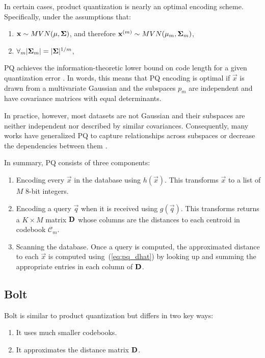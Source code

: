 In certain cases, product quantization is nearly an optimal encoding scheme. Specifically, under the assumptions that:
\begin{enumerate}[leftmargin=7mm]
\item $\mathbf{x} \sim MVN(\mathbf{\mu}, \mathbf{\Sigma})$, and therefore $\mathbf{x}^{(m)} \sim MVN(\mathbf{\mu}_m, \mathbf{\Sigma}_m)$,
\item $\forall_m |\mathbf{\Sigma}_m| = |\mathbf{\Sigma}|^{1/m}$,
\end{enumerate}
PQ achieves the information-theoretic lower bound on code length for a given quantization error \cite{opq}. In words, this means that PQ encoding is optimal if $\vec{x}$ is drawn from a multivariate Gaussian and the subspaces $p_m$ are independent and have covariance matrices with equal determinants.

In practice, however, most datasets are not Gaussian and their subspaces are neither independent nor described by similar covariances. Consequently, many works have generalized PQ to capture relationships across subspaces or decrease the dependencies between them \cite{opq, cartesianKmeans, aq, otq, lsq}.

In summary, PQ consists of three components:
\begin{enumerate}[leftmargin=7mm]
    \item Encoding every $\vec{x}$ in the database using $h(\vec{x})$. This transforms $\vec{x}$ to a list of $M$ 8-bit integers.
    \item Encoding a query $\vec{q}$ when it is received using $g(\vec{q})$. This transforms returns a $K \times M$ matrix $\mathbf{D}$ whose columns are the distances to each centroid in codebook $\mathcal{C}_m$.
    \item Scanning the database. Once a query is computed, the approximated distance to each $\vec{x}$ is computed using~(\ref{eq:pq_dhat}) by looking up and summing the appropriate entries in each column of $\mathbf{D}$.
\end{enumerate}

\subsection{Bolt}

Bolt is similar to product quantization but differs in two key ways:
\begin{enumerate}[leftmargin=7mm]
\item It uses much smaller codebooks.
\item It approximates the distance matrix $\mathbf{D}$.
\end{enumerate}

